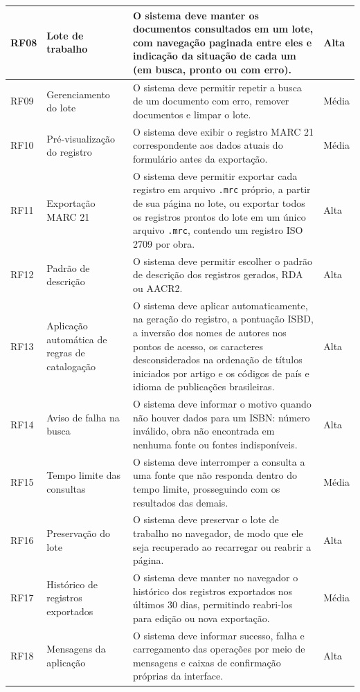 \begin{longtable}{|p{}|p{}|p{}|p{}|}
    RF08 & Lote de trabalho & O sistema deve manter os documentos consultados em um lote, com navegação paginada entre eles e indicação da situação de cada um (em busca, pronto ou com erro). & Alta \\ \hline
    RF09 & Gerenciamento do lote & O sistema deve permitir repetir a busca de um documento com erro, remover documentos e limpar o lote. & Média \\ \hline
    RF10 & Pré-visualização do registro & O sistema deve exibir o registro MARC 21 correspondente aos dados atuais do formulário antes da exportação. & Média \\ \hline
    RF11 & Exportação MARC 21 & O sistema deve permitir exportar cada registro em arquivo \texttt{.mrc} próprio, a partir de sua página no lote, ou exportar todos os registros prontos do lote em um único arquivo \texttt{.mrc}, contendo um registro ISO 2709 por obra. & Alta \\ \hline
    RF12 & Padrão de descrição & O sistema deve permitir escolher o padrão de descrição dos registros gerados, RDA ou AACR2. & Alta \\ \hline
    RF13 & Aplicação automática de regras de catalogação & O sistema deve aplicar automaticamente, na geração do registro, a pontuação ISBD, a inversão dos nomes de autores nos pontos de acesso, os caracteres desconsiderados na ordenação de títulos iniciados por artigo e os códigos de país e idioma de publicações brasileiras. & Alta \\ \hline
    RF14 & Aviso de falha na busca & O sistema deve informar o motivo quando não houver dados para um ISBN: número inválido, obra não encontrada em nenhuma fonte ou fontes indisponíveis. & Alta \\ \hline
    RF15 & Tempo limite das consultas & O sistema deve interromper a consulta a uma fonte que não responda dentro do tempo limite, prosseguindo com os resultados das demais. & Média \\ \hline
    RF16 & Preservação do lote & O sistema deve preservar o lote de trabalho no navegador, de modo que ele seja recuperado ao recarregar ou reabrir a página. & Alta \\ \hline
    RF17 & Histórico de registros exportados & O sistema deve manter no navegador o histórico dos registros exportados nos últimos 30 dias, permitindo reabri-los para edição ou nova exportação. & Média \\ \hline
    RF18 & Mensagens da aplicação & O sistema deve informar sucesso, falha e carregamento das operações por meio de mensagens e caixas de confirmação próprias da interface. & Alta \\ \hline
\end{longtable}

